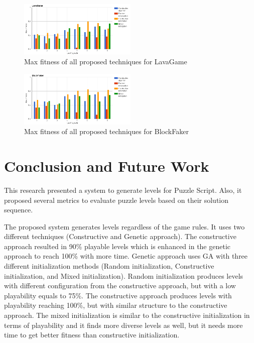 \documentclass[letterpaper]{article}
\begin{document}
\begin{figure}[ht]
  	\centering
    \includegraphics[width=0.5\textwidth]{Images/lavaGameComparison}
    \caption{Max fitness of all proposed techniques for LavaGame}
    \label{Figure:lavaGameComparisonmparison}
\end{figure}

\begin{figure}[ht]
  	\centering
    \includegraphics[width=0.5\textwidth]{Images/blockFakerComparison}
    \caption{Max fitness of all proposed techniques for BlockFaker}
    \label{Figure:blockFakerComparison}
\end{figure}

\section{Conclusion and Future Work}
This research presented a system to generate levels for Puzzle Script. Also, it proposed several metrics to evaluate puzzle levels based on their solution sequence.\\\par

The proposed system generates levels regardless of the game rules. It uses two different techniques (Constructive and Genetic approach). The constructive approach resulted in 90\% playable levels which is enhanced in the genetic approach to reach 100\% with more time. Genetic approach uses GA with three different initialization methods (Random initialization, Constructive initialization, and Mixed initialization). Random initialization produces levels with different configuration from the constructive approach, but with a low playability equals to 75\%.  The constructive approach produces levels with playability reaching 100\%, but with similar structure to the constructive approach. The mixed initialization is similar to the constructive initialization in terms of playability and it finds more diverse levels as well, but it needs more time to get better fitness than constructive initialization.\\\par
\end{document}
